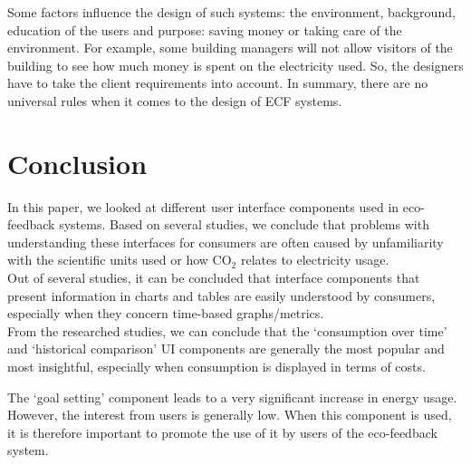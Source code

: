 \documentclass[journal]{vgtc}                %
\begin{document}
 Some factors influence the design of such systems: the environment, background, education of the users and purpose: saving money or taking care of the environment.
For example, some building managers will not allow visitors of the building to see how much money is spent on the electricity used. So, the designers have to take the client requirements into account.
In summary, there are no universal rules when it comes to the design of ECF systems.



%
%
%
%
%


\section{Conclusion}
In this paper, we looked at different user interface components used in eco-feedback systems. Based on several studies, we conclude that problems with understanding these interfaces for consumers are often caused by unfamiliarity with the scientific units used or how CO$_2$ relates to electricity usage. \\

Out of several studies, it can be concluded that interface components that present information in charts and tables are easily understood by consumers, especially when they concern time-based graphs/metrics. \\

From the researched studies, we can conclude that the `consumption over time' and `historical comparison' UI components are generally the most popular and most insightful, especially when consumption is displayed in terms of costs.

The `goal setting' component leads to a very significant increase in energy usage. However, the interest from users is generally low. When this component is used, it is therefore important to promote the use of it by users of the eco-feedback system.
\end{document}
